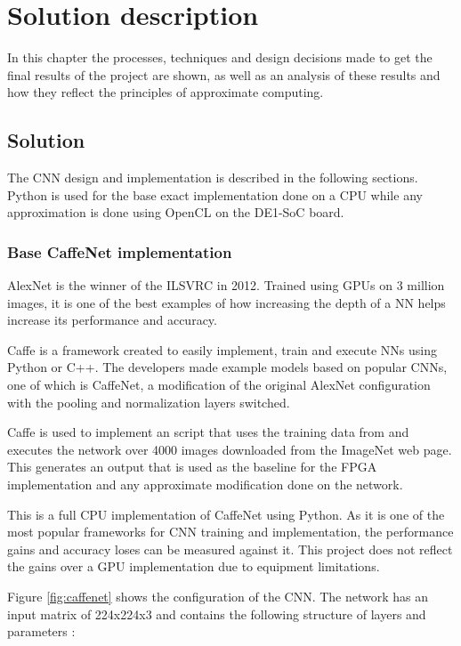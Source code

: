 \chapter{Solution description}

In this chapter the processes, techniques and design decisions made
to get the final results of the project are shown, as well as an analysis
of these results and how they reflect the principles of approximate computing.

\section{Solution}

The CNN design and implementation is described in the following sections.
Python is used for the base exact implementation done on a CPU while any approximation is done
using OpenCL on the DE1-SoC board.

\subsection{Base CaffeNet implementation}

AlexNet is the winner of the ILSVRC in 2012. Trained using GPUs on 3 million images, it is one
of the best examples of how increasing the depth of a NN helps increase its performance and accuracy.

Caffe is a framework created to easily implement, train and execute NNs using Python or C++.
The developers made example models based on popular CNNs, one of which is CaffeNet, a modification of the original
AlexNet configuration with the pooling and normalization layers switched.

Caffe is used to implement an script that uses the training data from \cite{donahue2012bvlc} and executes the network
over 4000 images downloaded from the ImageNet web page. This generates an output that is used as the baseline
for the FPGA implementation and any approximate modification done on the network.

This is a full CPU implementation of CaffeNet using Python. As it is one of the most popular frameworks for CNN
training and implementation, the performance gains and accuracy loses can be measured against it. This project
does not reflect the gains over a GPU implementation due to equipment limitations.

Figure \ref{fig:caffenet} shows the configuration of the CNN. The network has an input matrix of 224{x}224{x}3
and 
contains the following structure of layers and parameters \cite{reviewalex}:

